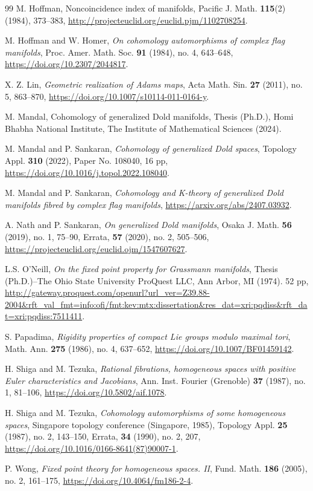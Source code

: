 \documentclass{amsart}
\begin{document}
\begin{thebibliography}{99}
 M. Hoffman, Noncoincidence index of manifolds, Pacific J. Math. \textbf{115}(2) (1984), 373--383, \url{http://projecteuclid.org/euclid.pjm/1102708254}.

 M. Hoffman and W. Homer, \textit{On cohomology automorphisms of complex flag manifolds}, Proc. Amer. Math. Soc. \textbf{91} (1984), no. 4, 643--648, \url{https://doi.org/10.2307/2044817}.

    
 X. Z. Lin, \textit{Geometric realization of Adams maps}, Acta Math. Sin. \textbf{27} (2011), no. 5, 863--870, \url{https://doi.org/10.1007/s10114-011-0164-y}.

 M. Mandal, Cohomology of generalized Dold manifolds, Thesis (Ph.D.), Homi Bhabha National Institute, The Institute of Mathematical Sciences (2024).
	
 M. Mandal and P. Sankaran, \textit{Cohomology of generalized Dold spaces}, Topology Appl. \textbf{310} (2022), Paper No. 108040, 16 pp, \url{https://doi.org/10.1016/j.topol.2022.108040}.
    
 M. Mandal and P. Sankaran, \textit{Cohomology and K-theory of generalized Dold manifolds fibred by complex flag manifolds}, \url{https://arxiv.org/abs/2407.03932}.
	
 A. Nath and P. Sankaran, \textit{On generalized Dold manifolds}, Osaka J. Math. \textbf{56} (2019), no. 1, 75--90, Errata, \textbf{57} (2020), no. 2, 505--506, \url{https://projecteuclid.org/euclid.ojm/1547607627}.
	
 L.S. O'Neill, \textit{On the fixed point property for Grassmann manifolds}, Thesis (Ph.D.)--The Ohio State University ProQuest LLC, Ann Arbor, MI (1974). 52 pp, \url{http://gateway.proquest.com/openurl?url_ver=Z39.88-2004&rft_val_fmt=info:ofi/fmt:kev:mtx:dissertation&res_dat=xri:pqdiss&rft_dat=xri:pqdiss:7511411}.
  
 S. Papadima, \textit{Rigidity properties of compact Lie groups modulo maximal tori}, Math. Ann. \textbf{275} (1986), no. 4, 637--652, \url{https://doi.org/10.1007/BF01459142}.
	
 H. Shiga and M. Tezuka, \textit{Rational fibrations, homogeneous spaces with positive Euler characteristics and Jacobians}, Ann. Inst. Fourier (Grenoble) \textbf{37} (1987), no. 1, 81--106, \url{https://doi.org/10.5802/aif.1078}.
	
 H. Shiga and M. Tezuka, \textit{Cohomology automorphisms of some homogeneous spaces}, Singapore topology conference (Singapore, 1985), Topology Appl. \textbf{25} (1987), no. 2, 143--150, Errata, \textbf{34} (1990), no. 2, 207, \url{https://doi.org/10.1016/0166-8641(87)90007-1}.

 P. Wong, \textit{Fixed point theory for homogeneous spaces. II}, Fund. Math. \textbf{186} (2005), no. 2, 161--175, \url{https://doi.org/10.4064/fm186-2-4}.
\end{thebibliography}
\end{document}
